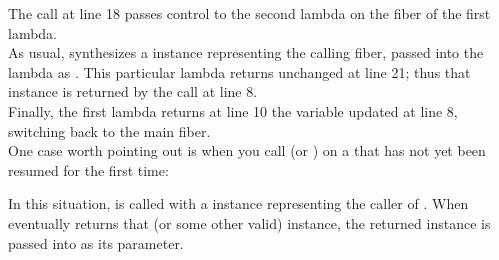 
The  call at line 18 passes control to the second
lambda on the fiber of the first lambda.\\

As usual, \resumewith synthesizes a \fiber instance representing the calling
fiber, passed into the lambda as . This particular lambda returns 
unchanged at line 21; thus that  instance is returned by the \resume call
at line 8.\\

Finally, the first lambda returns at line 10 the  variable updated at
line 8, switching back to the main fiber.\\

One case worth pointing out is when you call \resumewith (or \xtresumewith) on
a \fiber that has not yet been resumed for the first time:

In this situation,  is called with a \fiber instance
representing the caller of \resumewith. When  eventually
returns that (or some other valid) \fiber instance, the returned \fiber
instance is passed into  as its  parameter.

